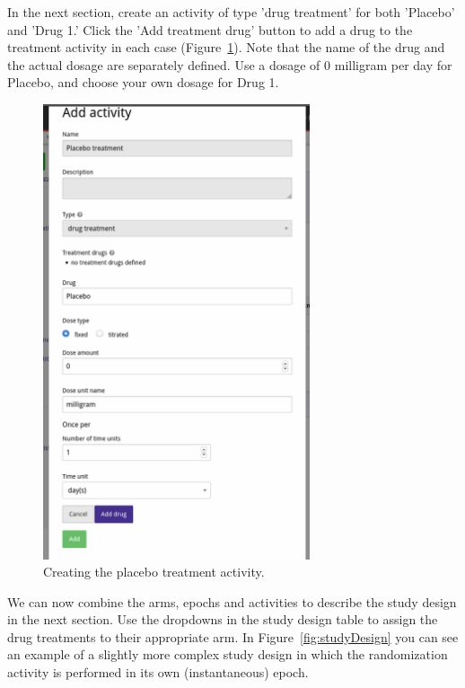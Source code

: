 \documentclass[12pt]{article}
\begin{document}
In the next section, create an activity of type 'drug treatment' for both 'Placebo' and 'Drug 1.'
Click the 'Add treatment drug' button to add a drug to the treatment activity in each case (Figure~\ref{fig:addPlaceboTreatment}).
Note that the name of the drug and the actual dosage are separately defined.
Use a dosage of 0 milligram per day for Placebo, and choose your own dosage for Drug 1.

\begin{figure}[!ht]
  \centering
  \includegraphics[width=0.7\textwidth]{img/addPlaceboTreatment.png}
  \caption{Creating the placebo treatment activity.}
\label{fig:addPlaceboTreatment}
\end{figure}

We can now combine the arms, epochs and activities to describe the study design in the next section.
Use the dropdowns in the study design table to assign the drug treatments to their appropriate arm.
In Figure~\ref{fig:studyDesign} you can see an example of a slightly more complex study design in which the randomization activity is performed in its own (instantaneous) epoch.
\end{document}
